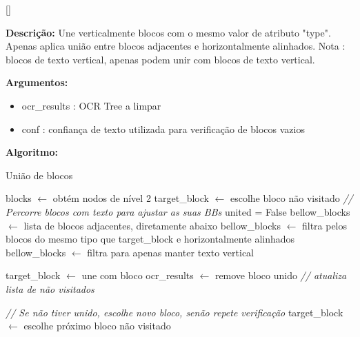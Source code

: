 [\normalsize]

\textbf{Descrição:} Une verticalmente blocos com o mesmo valor de atributo "type". Apenas aplica união entre blocos adjacentes e horizontalmente alinhados. Nota : blocos de texto vertical, apenas podem unir com blocos de texto vertical.

\textbf{Argumentos:}
\begin{itemize}\setlength\itemsep{-0.3em}
	\vspace{-0.5em}
	\item ocr\_results : OCR Tree a limpar
	\item conf : confiança de texto utilizada para verificação de blocos vazios
\end{itemize}

\textbf{Algoritmo:}
\begin{breakablealgorithm}
	\caption{União de blocos}
	\begin{algorithmic}[1]
		
		\State blocks $\leftarrow$ obtém nodos de nível 2
		\State target\_block $\leftarrow$ escolhe bloco não visitado
		\State \textit{// Percorre blocos com texto para ajustar as suas BBs}
			\State united = False
			\State bellow\_blocks $\leftarrow$ lista de blocos adjacentes, diretamente abaixo
			\State bellow\_blocks $\leftarrow$ filtra pelos blocos do mesmo tipo que target\_block e horizontalmente alinhados
					\State bellow\_blocks $\leftarrow$ filtra para apenas manter texto vertical
				\EndIf
				
					\State target\_block $\leftarrow$ une com bloco
					\State ocr\_results $\leftarrow$ remove bloco unido
					\State \textit{// atualiza lista de não visitados}
				\EndIf
				
			\EndIf
			
			\State \textit{// Se não tiver unido, escolhe novo bloco, senão repete verificação}
				\State target\_block $\leftarrow$ escolhe próximo bloco não visitado
			\EndIf
		\EndWhile
		
		
	\end{algorithmic}
\end{breakablealgorithm}


